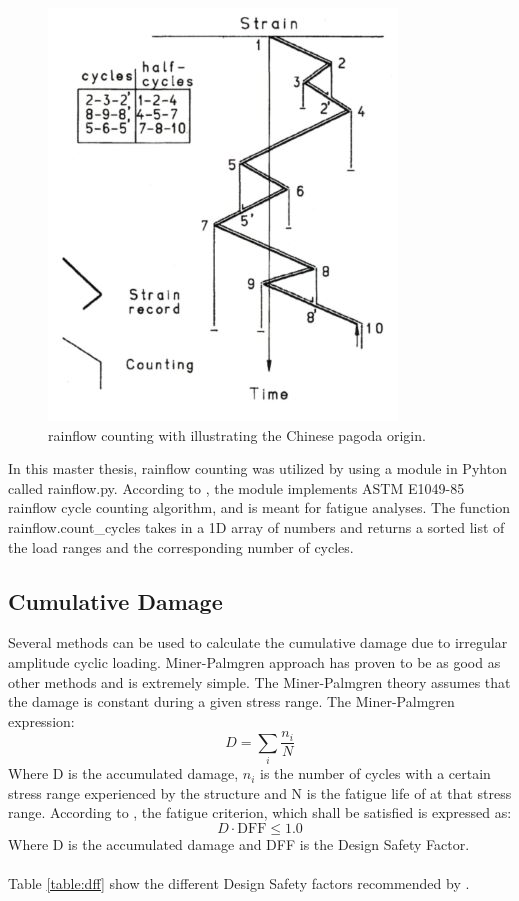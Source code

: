 \begin{figure}[H]
\centering
\includegraphics[scale=0.9]{figures/pagoda}
\caption[$\; \:$rainflow counting]{rainflow counting with illustrating the Chinese pagoda origin.    \cite{fatigue2016} }
 \label{fig:pagoda}
\end{figure}
\noindent In this master thesis, rainflow counting was utilized by using a module in Pyhton called rainflow.py. According to \cite{rf}, the module implements ASTM E1049-85 rainflow cycle counting
algorithm, and is meant for fatigue analyses. The function rainflow.count\_cycles takes in a 1D array of numbers and returns a sorted list of the load ranges and the corresponding
number of cycles.

\subsection{Cumulative Damage}
Several methods can be used to calculate the cumulative damage due to irregular amplitude cyclic loading. Miner-Palmgren approach has proven to be as good as other methods and is extremely simple. The Miner-Palmgren theory assumes that the damage is constant during a given stress range. The Miner-Palmgren expression:
\begin{equation}
    D=\sum_i \frac{n_i}{N} 
    \label{eq:MP}
\end{equation}
Where D is the accumulated damage, $n_i$ is the number of cycles with a certain stress range experienced by the structure and N is the fatigue life of at that stress range.\newline
\newline
According to \cite{riserfat}, the fatigue criterion, which shall be satisfied is expressed as:
\begin{equation}
    D \cdot \text{DFF} \leq 1.0
\end{equation}
Where D is the accumulated damage and DFF is the Design Safety Factor.\\\\ Table \ref{table:dff} show the different Design Safety factors recommended by \cite{riserfat}. 

